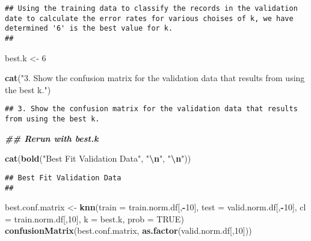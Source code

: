 \documentclass[
]{article}
\newenvironment{Shaded}{\begin{snugshade}}{\end{snugshade}}
\newcommand{\AttributeTok}[1]{\textcolor[rgb]{0.13,0.29,0.53}{#1}}
\newcommand{\ConstantTok}[1]{\textcolor[rgb]{0.56,0.35,0.01}{#1}}
\newcommand{\DecValTok}[1]{\textcolor[rgb]{0.00,0.00,0.81}{#1}}
\newcommand{\DocumentationTok}[1]{\textcolor[rgb]{0.56,0.35,0.01}{\textbf{\textit{#1}}}}
\newcommand{\FunctionTok}[1]{\textcolor[rgb]{0.13,0.29,0.53}{\textbf{#1}}}
\newcommand{\NormalTok}[1]{#1}
\newcommand{\OtherTok}[1]{\textcolor[rgb]{0.56,0.35,0.01}{#1}}
\newcommand{\SpecialCharTok}[1]{\textcolor[rgb]{0.81,0.36,0.00}{\textbf{#1}}}
\newcommand{\StringTok}[1]{\textcolor[rgb]{0.31,0.60,0.02}{#1}}
\begin{document}
\begin{verbatim}
## Using the training data to classify the records in the validation date to calculate the error rates for various choises of k, we have determined '6' is the best value for k. 
## 
\end{verbatim}

\begin{Shaded}
\begin{Highlighting}[]
\NormalTok{best.k }\OtherTok{\textless{}{-}} \DecValTok{6}
\end{Highlighting}
\end{Shaded}

\begin{Shaded}
\begin{Highlighting}[]
\FunctionTok{cat}\NormalTok{(}\StringTok{"3. Show the confusion matrix for the validation data that results from using the best k."}\NormalTok{)}
\end{Highlighting}
\end{Shaded}

\begin{verbatim}
## 3. Show the confusion matrix for the validation data that results from using the best k.
\end{verbatim}

\begin{Shaded}
\begin{Highlighting}[]
\DocumentationTok{\#\# Rerun with best.k}

\FunctionTok{cat}\NormalTok{(}\FunctionTok{bold}\NormalTok{(}\StringTok{"Best Fit Validation Data"}\NormalTok{, }\StringTok{"}\SpecialCharTok{\textbackslash{}n}\StringTok{"}\NormalTok{, }\StringTok{"}\SpecialCharTok{\textbackslash{}n}\StringTok{"}\NormalTok{))}
\end{Highlighting}
\end{Shaded}

\begin{verbatim}
## Best Fit Validation Data 
## 
\end{verbatim}

\begin{Shaded}
\begin{Highlighting}[]
\NormalTok{best.conf.matrix }\OtherTok{\textless{}{-}} \FunctionTok{knn}\NormalTok{(}\AttributeTok{train =}\NormalTok{ train.norm.df[,}\SpecialCharTok{{-}}\DecValTok{10}\NormalTok{], }\AttributeTok{test =}\NormalTok{ valid.norm.df[,}\SpecialCharTok{{-}}\DecValTok{10}\NormalTok{], }\AttributeTok{cl =}\NormalTok{ train.norm.df[,}\DecValTok{10}\NormalTok{], }\AttributeTok{k =}\NormalTok{ best.k, }\AttributeTok{prob =} \ConstantTok{TRUE}\NormalTok{)}
\FunctionTok{confusionMatrix}\NormalTok{(best.conf.matrix, }\FunctionTok{as.factor}\NormalTok{(valid.norm.df[,}\DecValTok{10}\NormalTok{]))}
\end{Highlighting}
\end{Shaded}
\end{document}
